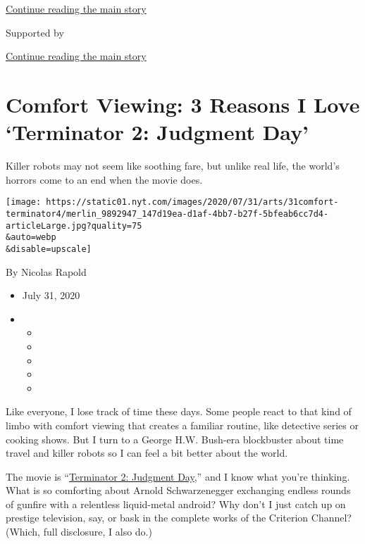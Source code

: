 \protect\hyperlink{after-top}{Continue reading the main story}

Supported by

\protect\hyperlink{after-sponsor}{Continue reading the main story}

\hypertarget{comfort-viewing-3-reasons-i-love-terminator-2-judgment-day}{%
\section{Comfort Viewing: 3 Reasons I Love `Terminator 2: Judgment
Day'}\label{comfort-viewing-3-reasons-i-love-terminator-2-judgment-day}}

Killer robots may not seem like soothing fare, but unlike real life, the
world's horrors come to an end when the movie does.

\texttt{[image: https://static01.nyt.com/images/2020/07/31/arts/31comfort-terminator4/merlin\_9892947\_147d19ea-d1af-4bb7-b27f-5bfeab6cc7d4-articleLarge.jpg?quality=75\\\&auto=webp\\\&disable=upscale]}

By Nicolas Rapold

\begin{itemize}
\item
  July 31, 2020
\item
  \begin{itemize}
  \item
  \item
  \item
  \item
  \item
  \end{itemize}
\end{itemize}

Like everyone, I lose track of time these days. Some people react to
that kind of limbo with comfort viewing that creates a familiar routine,
like detective series or cooking shows. But I turn to a George H.W.
Bush-era blockbuster about time travel and killer robots so I can feel a
bit better about the world.

The movie is
``\href{https://www.nytimes.com/1991/07/03/movies/review-film-in-new-terminator-the-forces-of-good-seek-peace-violently.html}{Terminator
2: Judgment Day},'' and I know what you're thinking. What is so
comforting about Arnold Schwarzenegger exchanging endless rounds of
gunfire with a relentless liquid-metal android? Why don't I just catch
up on prestige television, say, or bask in the complete works of the
Criterion Channel? (Which, full disclosure, I also do.)

